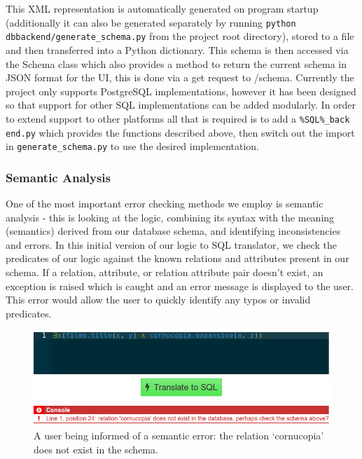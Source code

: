 \documentclass[a4paper, 11pt]{article}
\begin{document}
      This XML representation is automatically generated on program startup
      (additionally it can also be generated separately by running \texttt{python
      dbbackend/generate\_schema.py} from the project root directory),
      stored to a file and then transferred into a Python dictionary. This
      schema is then accessed via the Schema class which also provides a method
      to return the current schema in JSON format for the UI, this is done via a
      get request to /schema.
      Currently the project only supports PostgreSQL implementations, however it
      has been designed so that support for other SQL implementations can be
      added modularly. In order to extend support to other platforms all that is
      required is to add a \texttt{\%SQL\%\_back end.py} which provides the 
      functions described above, then switch out the import in
      \texttt{generate\_schema.py} to use the desired implementation.

    \subsubsection{Semantic Analysis}
      One of the most important error checking methods we employ is semantic
      analysis - this is looking at the logic, combining its syntax with the
      meaning (semantics) derived from our database schema, and identifying
      inconsistencies and errors. In this initial version of our logic to SQL
      translator, we check the predicates of our logic against the known
      relations and attributes present in our schema. If a relation, attribute,
      or relation attribute pair doesn't exist, an exception is raised which is
      caught and an error message is displayed to the user. This error would
      allow the user to quickly identify any typos or invalid predicates.

      \begin{figure}[h!]
        \centering
        \includegraphics[width=1.0\textwidth]{images/error.png}
        \caption{A user being informed of a semantic error: the relation
          `cornucopia' does not exist in the schema.}
      \end{figure}
\end{document}
